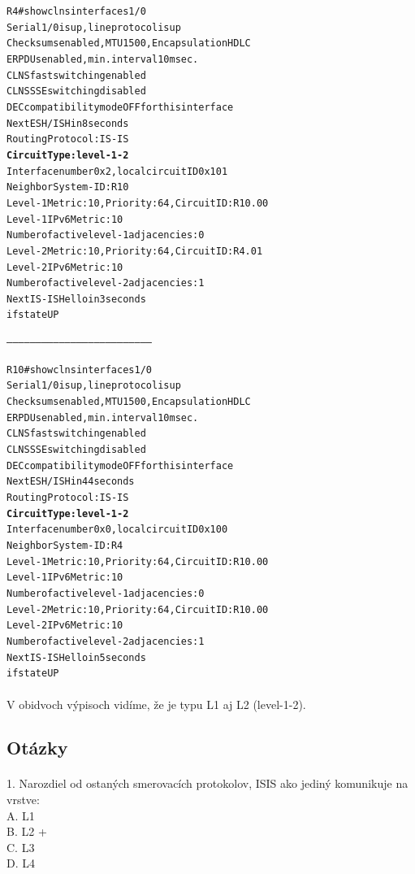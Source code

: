 \documentclass[12pt,twoside,a4paper]{report}
\begin{document}
\noindent
{\selectfont
\begin{small}
\begin{alltt}
R4#show clns interface s1/0
Serial1/0 is up, line protocol is up
  Checksums enabled, MTU 1500, Encapsulation HDLC
  ERPDUs enabled, min. interval 10 msec.
  CLNS fast switching enabled
  CLNS SSE switching disabled
  DEC compatibility mode OFF for this interface
  Next ESH/ISH in 8 seconds
  Routing Protocol: IS-IS
    \textbf{Circuit Type: level-1-2}
    Interface number 0x2, local circuit ID 0x101
    Neighbor System-ID: R10
    Level-1 Metric: 10, Priority: 64, Circuit ID: R10.00
    Level-1 IPv6 Metric: 10
    Number of active level-1 adjacencies: 0
    Level-2 Metric: 10, Priority: 64, Circuit ID: R4.01
    Level-2 IPv6 Metric: 10
    Number of active level-2 adjacencies: 1
    Next IS-IS Hello in 3 seconds
    if state UP


--------------------------------------------------------------------------


R10#show clns interface s1/0
Serial1/0 is up, line protocol is up
  Checksums enabled, MTU 1500, Encapsulation HDLC
  ERPDUs enabled, min. interval 10 msec.
  CLNS fast switching enabled
  CLNS SSE switching disabled
  DEC compatibility mode OFF for this interface
  Next ESH/ISH in 44 seconds
  Routing Protocol: IS-IS
    \textbf{Circuit Type: level-1-2}
    Interface number 0x0, local circuit ID 0x100
    Neighbor System-ID: R4
    Level-1 Metric: 10, Priority: 64, Circuit ID: R10.00
    Level-1 IPv6 Metric: 10
    Number of active level-1 adjacencies: 0
    Level-2 Metric: 10, Priority: 64, Circuit ID: R10.00
    Level-2 IPv6 Metric: 10
    Number of active level-2 adjacencies: 1
    Next IS-IS Hello in 5 seconds
    if state UP
\end{alltt}
\end{small}
}

\paragraph{}
V obidvoch výpisoch vidíme, že  je typu L1 aj L2 (level-1-2).

\subsection{Otázky}
\paragraph{}
1. Narozdiel od ostaných smerovacích protokolov, ISIS ako jediný komunikuje na vrstve:\\
  A. L1\\
  B. L2 +\\
  C. L3\\
  D. L4\\
\end{document}
